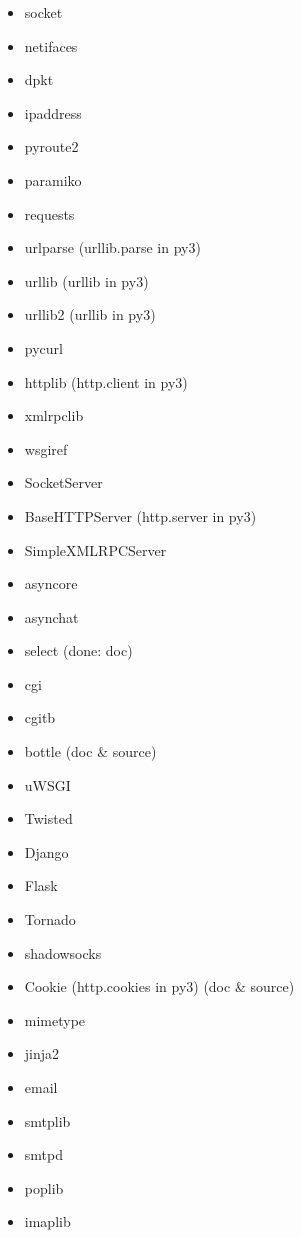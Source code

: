 \documentclass{article}
\begin{document}
\begin{enumerate}
\begin{itemize}
            \item socket
            \item netifaces
            \item dpkt
            \item ipaddress
            \item pyroute2
            \item paramiko
            \item requests
            \item urlparse (urllib.parse in py3)
            \item urllib (urllib in py3)
            \item urllib2 (urllib in py3)
            \item pycurl
            \item httplib (http.client in py3)
            \item xmlrpclib
            \item wsgiref
            \item SocketServer
            \item BaseHTTPServer (http.server in py3)
            \item SimpleXMLRPCServer
            \item asyncore
            \item asynchat
            \item select (done: doc)
            \item cgi
            \item cgitb
            \item bottle (doc & source)
            \item uWSGI
            \item Twisted
            \item Django
            \item Flask
            \item Tornado
            \item shadowsocks
            \item Cookie (http.cookies in py3) (doc & source)

            \item mimetype

            \item jinja2

            \item email
            \item smtplib
            \item smtpd
            \item poplib
            \item imaplib


\end{itemize}
\end{enumerate}
\end{document}
